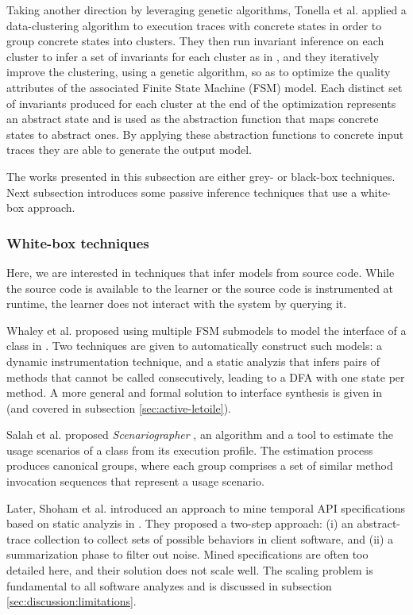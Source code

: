 Taking another direction by leveraging genetic algorithms,
Tonella et al. \cite{TonellaNMLH13} applied a data-clustering
algorithm to execution traces with concrete states in order to
group concrete states into clusters. They then run invariant
inference on each cluster to infer a set of invariants for each
cluster as in \cite{Ernst:1999:DDL:302405.302467,Ernst200735},
and they iteratively improve the clustering, using a genetic
algorithm, so as to optimize the quality attributes of the
associated Finite State Machine (FSM) model. Each distinct set of
invariants produced for each cluster at the end of the
optimization represents an abstract state and is used as the
abstraction function that maps concrete states to abstract ones.
By applying these abstraction functions to concrete input traces
they are able to generate the output model.

The works presented in this subsection are either grey- or black-box
techniques. Next subsection introduces some passive inference
techniques that use a white-box approach.


\subsubsection{White-box techniques}
\label{sec:passive-white}

Here, we are interested in techniques that infer models from
source code. While the source code is available to the learner or
the source code is instrumented at runtime, the learner does not
interact with the system by querying it.

Whaley et al. proposed using multiple FSM submodels to model the
interface of a class in \cite{Whaley:2002:AEO:566171.566212}. Two
techniques are given to automatically construct such models: a
dynamic instrumentation technique, and a static analyzis that
infers pairs of methods that cannot be called consecutively,
leading to a DFA with one state per method. A more general and
formal solution to interface synthesis is given in
\cite{Alur:2005:SIS:1047659.1040314} (and covered in subsection
\ref{sec:active-letoile}).

Salah et al. proposed \textit{Scenariographer}
\cite{Salah05scenariographer}, an algorithm and a tool to
estimate the usage scenarios of a class from its execution
profile. The estimation process produces canonical groups, where
each group comprises a set of similar method invocation sequences
that represent a usage scenario.

Later, Shoham et al. introduced an approach to mine temporal API
specifications based on static analyzis in
\cite{Shoham:2007:SSM:1273463.1273487}. They proposed a two-step
approach: (i) an abstract-trace collection to collect sets of
possible behaviors in client software, and (ii) a summarization
phase to filter out noise. Mined specifications are often too
detailed here, and their solution does not scale well. The
scaling problem is fundamental to all software analyzes and is
discussed in subsection \ref{sec:discussion:limitations}.


